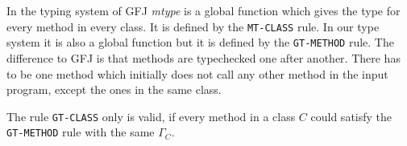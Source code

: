 In the typing system of GFJ \textit{mtype} is a global function which gives the type for every method in every class.
It is defined by the \texttt{MT-CLASS} rule.
In our type system it is also a global function but it is defined by the \texttt{GT-METHOD} rule.
The difference to GFJ is that methods are typechecked one after another.
There has to be one method which initially does not call any other method in the input program,
except the ones in the same class.

The rule \texttt{GT-CLASS} only is valid, if every method in a class $C$ could satisfy the \texttt{GT-METHOD} rule with the same $\Gamma_C$.



